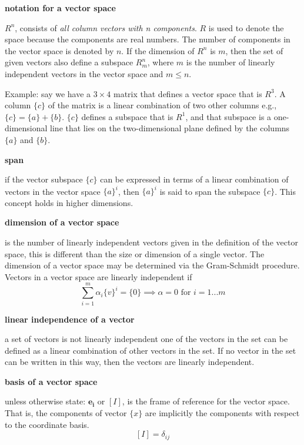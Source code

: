 \documentclass[letterpaper,reqno,oneside]{amsart}
\newenvironment{dd}[1]{
	\noindent
	\textbf{\normalsize{#1}}
	\hspace{0.1in}
	\small
	\rmfamily
	}
	{\medskip}
\begin{document}
\begin{dd}{notation for a vector space}
$R^n$, consists of \emph{all column vectors with n components}. $R$ is used to denote the space because the components are real numbers.  The number of components in the vector space is denoted by $n$. If the dimension of $R^n$ is $m$, then the set of given vectors also define a subspace $R^n_m$, where $m$  is the number of linearly independent vectors in the vector space and $m \le n$.

Example: say we have a $3 \times 4$ matrix that defines a vector space that is $R^3$. A column $\{c\}$ of the matrix is a linear combination of two other columns e.g., $\{c\} = \{a\} + \{b\}$.  $\{c\}$ defines a subspace that is $R^1$, and that subspace is a one-dimensional line that lies on the two-dimensional plane defined by the columns $\{a\}$ and $\{b\}$.  
\end{dd}

\begin{dd}{span}
if the vector subspace $\{c\}$ can be expressed in terms of a linear combination of vectors in the vector space $\{a\}^i$, then $\{a\}^i$ is said to span the subspace $\{c\}$. This concept holds in higher dimensions.
\end{dd}

\begin{dd}{dimension of a vector space}
is  the number of linearly independent vectors given in the definition of the vector space, this is different than the size or dimension of a single vector. The dimension of a vector space may be determined via the Gram-Schmidt procedure.  Vectors in a vector space are linearly independent if
$$\sum_{i=1}^m \alpha_i \{v\}^i = \{0\} \implies \alpha = 0 \text{ for } i=1...m$$
\end{dd}

\begin{dd}{linear independence of a vector}
a set of vectors is not linearly independent one of the vectors in the set can be defined as a linear combination of other vectors in the set. If no vector in the set can be written in this way, then the vectors are linearly independent.
\end{dd}

\begin{dd}{basis of a vector space}
unless otherwise state: $\mathbf{e_i}$ or $[I]$, is the frame of reference for the vector space.  That is, the components of vector $\{x\}$ are implicitly the components with respect to the coordinate basis.
$$ [I] = \delta_{ij}$$
\end{dd}
\end{document}
